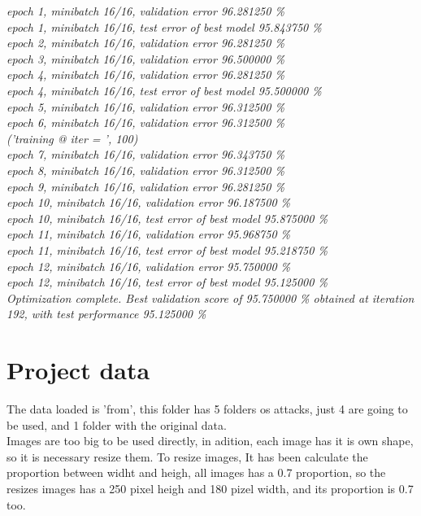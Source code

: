 \documentclass[a4paper]{article}
\begin{document}
\textit{
 epoch 1, minibatch 16/16, validation error 96.281250 \% \\
     epoch 1, minibatch 16/16, test error of best model 95.843750 \%  \\
epoch 2, minibatch 16/16, validation error 96.281250 \% \\
epoch 3, minibatch 16/16, validation error 96.500000 \% \\
epoch 4, minibatch 16/16, validation error 96.281250 \% \\
     epoch 4, minibatch 16/16, test error of best model 95.500000 \%  \\ 
epoch 5, minibatch 16/16, validation error 96.312500 \% \\
epoch 6, minibatch 16/16, validation error 96.312500 \% \\
('training @ iter = ', 100) \\
epoch 7, minibatch 16/16, validation error 96.343750 \%  \\
epoch 8, minibatch 16/16, validation error 96.312500 \% \\
epoch 9, minibatch 16/16, validation error 96.281250 \% \\
epoch 10, minibatch 16/16, validation error 96.187500 \% \\
     epoch 10, minibatch 16/16, test error of best model 95.875000 \% \\
epoch 11, minibatch 16/16, validation error 95.968750 \% \\
     epoch 11, minibatch 16/16, test error of best model 95.218750 \% \\
epoch 12, minibatch 16/16, validation error 95.750000 \% \\
     epoch 12, minibatch 16/16, test error of best model 95.125000 \% \\
Optimization complete. 
Best validation score of 95.750000 \%  obtained at iteration 192, with test performance 95.125000 \% }\\


\section{Project data}

The data loaded is 'from', this folder has 5 folders os attacks, just 4 are going to be used, and 1 folder with the original data. \\

Images are too big to be used directly, in adition, each image has it is own shape, so it is necessary resize them. To resize images, It has been calculate the proportion between widht and heigh, all images has a 0.7 proportion, so the resizes images has a 250 pixel heigh and 180 pizel width, and its proportion is 0.7 too.\\
\end{document}
